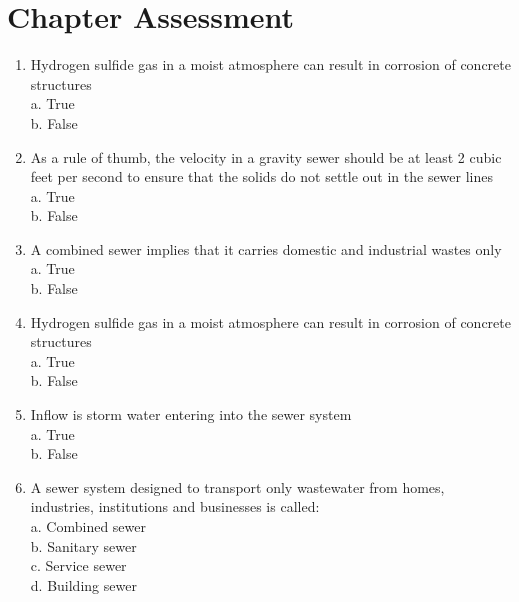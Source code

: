  \section*{Chapter Assessment}
\begin{tcolorbox}[breakable, enhanced,
colframe=blue!25,
colback=blue!10,
coltitle=blue!20!black,  
title= Chapter Assessment]

\begin{enumerate}
\item  Hydrogen sulfide gas in a moist atmosphere can result in corrosion of concrete structures \\

a. True \\
b. False \\

\item  As a rule of thumb, the velocity in a gravity sewer should be at least 2 cubic feet per second to ensure that the solids do not settle out in the sewer lines\\

a. True \\
b. False \\

\item  A combined sewer implies that it carries domestic and industrial wastes only \\

a. True \\
b. False \\

\item  Hydrogen sulfide gas in a moist atmosphere can result in corrosion of concrete structures \\

a. True \\
b. False \\

\item  Inflow is storm water entering into the sewer system \\

a. True \\
b. False \\


\item  A sewer system designed to transport only wastewater from homes, industries, institutions and businesses is called: \\

a. Combined sewer \\
b. Sanitary sewer \\
c. Service sewer \\
d. Building sewer \\


\end{enumerate}
\end{tcolorbox}
